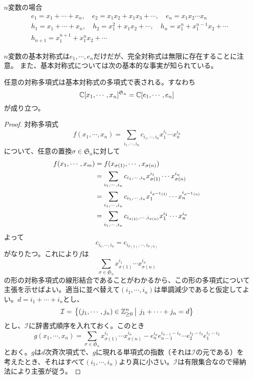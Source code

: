 \documentclass{ltjsarticle}
\begin{document}
\begin{eg}
    $n$変数の場合
    \begin{align*}
        &e_1=x_1+\cdots+x_n,\quad e_2=x_1x_2+x_1x_3+\cdots,\quad e_n=x_1x_2\cdots x_n\\
        &h_1=x_1+\cdots+x_n,\quad h_2=x_1^2+x_1x_2+\cdots, \quad h_n=x_1^n+x_1^{n-1}x_2+\cdots\\
        &h_{n+1}=x_1^{n+1}+x_1^nx_2+\cdots
    \end{align*}
\end{eg}


$n$変数の基本対称式は$e_1,\cdots, e_n$だけだが、完全対称式は無限に存在することに注意。
また、基本対称式については次の基本的な事実が知られている。

\begin{theo}[対称式の基本定理]\label{FT_of_sym}
    任意の対称多項式は基本対称式の多項式で表される。すなわち
    \[
    \mathbb{C}[x_1,\cdots,x_n]^{\mathfrak{S}_n}=\mathbb{C}[e_1,\cdots, e_n]
    \]
    が成り立つ。
\end{theo}

\begin{proof}
    対称多項式
    \[
    f(x_1,\cdots,x_n)=\sum_{i_1,\cdots,i_n}c_{i_1,\cdots,i_n}x_1^{i_1}\cdots x_n^{i_n}
    \]
    について、任意の置換$\sigma\in\mathfrak{S}_n$に対して
    \begin{align*}
        f(x_1,\cdots,x_m)&=f(x_{\sigma(1)},\cdots,x_{\sigma(n)})\\
        &=\sum_{i_1,\cdots,i_n}c_{i_1,\cdots,i_n}x_{\sigma(1)}^{i_1}\cdots x_{\sigma(n)}^{i_n}\\
        &=\sum_{i_1,\cdots,i_n}c_{i_1,\cdots,i_n}x_1^{i_{\sigma^{-1}(1)}}\cdots x_n^{i_{\sigma^{-1}(n)}}\\
        &=\sum_{i_1,\cdots,i_n}c_{i_{\sigma(1)},\cdots,i_{\sigma(n)}}x_1^{i_1}\cdots x_n^{i_n}
    \end{align*}
    よって
    \[
        c_{i_1,\cdots,i_n}=c_{i_{\sigma(1)},\cdots,i_{\sigma(n)}}
    \]
    がなりたつ。これにより$f$は
    \begin{equation}
        \sum_{\sigma\in\mathfrak{S}_n}x_{\sigma(1)}^{i_1}\cdots x_{\sigma(n)}^{i_n}
    \end{equation}
    の形の対称多項式の線形結合であることがわかるから、この形の多項式について主張を示せばよい。適当に並べ替えて$(i_1,\cdots,i_n)$は単調減少であると仮定してよい。$d=i_1+\cdots+i_n$とし、
    \[
        \mathcal{I}=\left.\left\{(j_1,\cdots,j_n)\in\mathbb{Z}_{\geq 0}^n \: \right| \: j_1+\cdots+j_n=d\right\}
    \]
    とし、$\mathcal{I}$に辞書式順序を入れておく。このとき
    \[
        g(x_1,\cdots,x_n)=\sum_{\sigma\in\mathfrak{S}_n}x_{\sigma(1)}^{i_1}\cdots x_{\sigma(n)}^{i_n}-e_n^{i_n}e_{n-1}^{i_{n-1}-i_n}\cdots e_2^{i_2-i_3}e_1^{i_1-i_2} 
    \]
    とおく。$g$は$d$次斉次項式で、$g$に現れる単項式の指数（それは$\mathcal{I}$の元である）を考えたとき、それはすべて$(i_1,\cdots,i_n)$より真に小さい。$\mathcal{I}$は有限集合なので帰納法により主張が従う。
\end{proof}
\end{document}
